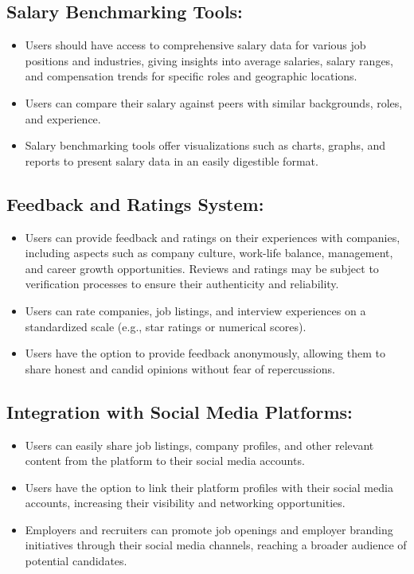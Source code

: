 \documentclass[titlepage]{article}
\begin{document}
\subsection{Salary Benchmarking Tools:}
\begin{itemize}
    \item Users should have access to comprehensive salary data for various job positions and industries, giving insights into average salaries, salary ranges, and compensation trends for specific roles and geographic locations.
    \item Users can compare their salary against peers with similar backgrounds, roles, and experience.
    \item Salary benchmarking tools offer visualizations such as charts, graphs, and reports to present salary data in an easily digestible format.
\end{itemize}

\subsection{Feedback and Ratings System:}
\begin{itemize}
    \item Users can provide feedback and ratings on their experiences with companies, including aspects such as company culture, work-life balance, management, and career growth opportunities. Reviews and ratings may be subject to verification processes to ensure their authenticity and reliability.
    \item Users can rate companies, job listings, and interview experiences on a standardized scale (e.g., star ratings or numerical scores).
    \item Users have the option to provide feedback anonymously, allowing them to share honest and candid opinions without fear of repercussions.
\end{itemize}
\subsection{Integration with Social Media Platforms:}
\begin{itemize}
    \item Users can easily share job listings, company profiles, and other relevant content from the platform to their social media accounts.
    \item Users have the option to link their platform profiles with their social media accounts, increasing their visibility and networking opportunities.
    \item Employers and recruiters can promote job openings and employer branding initiatives through their social media channels, reaching a broader audience of potential candidates.
\end{itemize}
\end{document}
